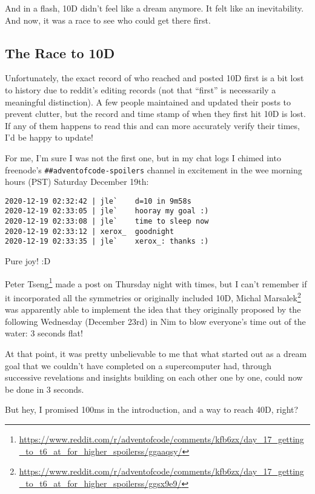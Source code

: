 \documentclass[]{article}
\renewcommand{\href}[2]{#2\footnote{\url{#1}}}
\begin{document}
And in a flash, 10D didn't feel like a dream anymore. It felt like an
inevitability. And now, it was a race to see who could get there first.

\hypertarget{the-race-to-10d}{%
\subsection{The Race to 10D}\label{the-race-to-10d}}

Unfortunately, the exact record of who reached and posted 10D first is a bit
lost to history due to reddit's editing records (not that ``first'' is
necessarily a meaningful distinction). A few people maintained and updated their
posts to prevent clutter, but the record and time stamp of when they first hit
10D is lost. If any of them happens to read this and can more accurately verify
their times, I'd be happy to update!

For me, I'm sure I was not the first one, but in my chat logs I chimed into
freenode's \texttt{\#\#adventofcode-spoilers} channel in excitement in the wee
morning hours (PST) Saturday December 19th:

\begin{verbatim}
2020-12-19 02:32:42 | jle`    d=10 in 9m58s
2020-12-19 02:33:05 | jle`    hooray my goal :)
2020-12-19 02:33:08 | jle`    time to sleep now
2020-12-19 02:33:12 | xerox_  goodnight
2020-12-19 02:33:35 | jle`    xerox_: thanks :)
\end{verbatim}

Pure joy! :D

\href{https://www.reddit.com/r/adventofcode/comments/kfb6zx/day_17_getting_to_t6_at_for_higher_spoilerss/ggaaqsy/}{Peter
Tseng} made a post on Thursday night with times, but I can't remember if it
incorporated all the symmetries or originally included 10D,
\href{https://www.reddit.com/r/adventofcode/comments/kfb6zx/day_17_getting_to_t6_at_for_higher_spoilerss/ggsx9e9/}{Michal
Marsalek} was apparently able to implement the idea that they originally
proposed by the following Wednesday (December 23rd) in Nim to blow everyone's
time out of the water: 3 seconds flat!

At that point, it was pretty unbelievable to me that what started out as a dream
goal that we couldn't have completed on a supercomputer had, through successive
revelations and insights building on each other one by one, could now be done in
3 seconds.

But hey, I promised 100ms in the introduction, and a way to reach 40D, right?
\end{document}
